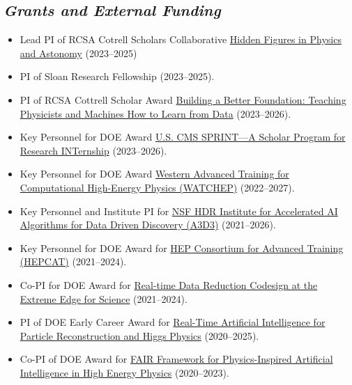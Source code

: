 \documentclass[11pt]{res}
\newcommand{\MarginText}[1]{\section{\textit{#1}}}
\begin{document}
\begin{resume}
  \MarginText{Grants and External Funding}
  \begin{itemize}
    \itemsep-0.3em
    \item Lead PI of RCSA Cotrell Scholars Collaborative \href{hiddenfigs.github.io}{Hidden Figures in Physics and Astonomy} ({2023--2025})
    \item PI of Sloan Research Fellowship (2023--2025).
    \item PI of RCSA Cottrell Scholar Award \href{https://rescorp.org/cottrell-scholars/2023-cottrell-scholars}{Building a Better Foundation: Teaching Physicists and Machines How to Learn from Data} ({2023--2026}).
    \item Key Personnel for DOE Award \href{https://www.energy.gov/articles/doe-announces-32-million-research-opportunities-underrepresented-groups}{U.S. CMS SPRINT---A Scholar Program for Research INTernship} (2023--2026).
    \item Key Personnel for DOE Award \href{https://www.energy.gov/science/articles/department-energy-announces-10-million-traineeships-computational-high-energy}{Western Advanced Training for Computational High-Energy Physics (WATCHEP)} (2022--2027).
    \item Key Personnel and Institute PI for \href{https://www.nsf.gov/awardsearch/showAward?AWD_ID=2117997&HistoricalAwards=false}{NSF HDR Institute for Accelerated AI Algorithms for Data Driven Discovery (A3D3)} ({2021--2026}).
    \item Key Personnel for DOE Award for \href{https://science.osti.gov/-/media/hep/pdf/Awards/HEP_instrumentation_awards_list.pdf}{HEP Consortium for Advanced Training (HEPCAT)} ({2021--2024}).
    \item Co-PI for DOE Award for \href{https://science.osti.gov/-/media/ascr/pdf/funding/2021/Data_Reduction_Awards.pdf}{Real-time Data Reduction Codesign at the Extreme Edge for Science} ({2021--2024}).
    \item PI of DOE Early Career Award for \href{https://science.osti.gov/-/media/early-career/pdf/FY20_DOE_SC_Early_Career_Research_Program_Abstracts.pdf}{Real-Time Artificial Intelligence for Particle Reconstruction and Higgs Physics} ({2020--2025}).
    \item Co-PI of DOE Award for \href{https://science.osti.gov/-/media/ascr/pdf/programdocuments/docs/2020/List_of_Awards_FAIR_Data.pdf}{FAIR Framework for Physics-Inspired Artificial Intelligence in High Energy Physics} ({2020--2023}).

\end{itemize}
\end{resume}
\end{document}
